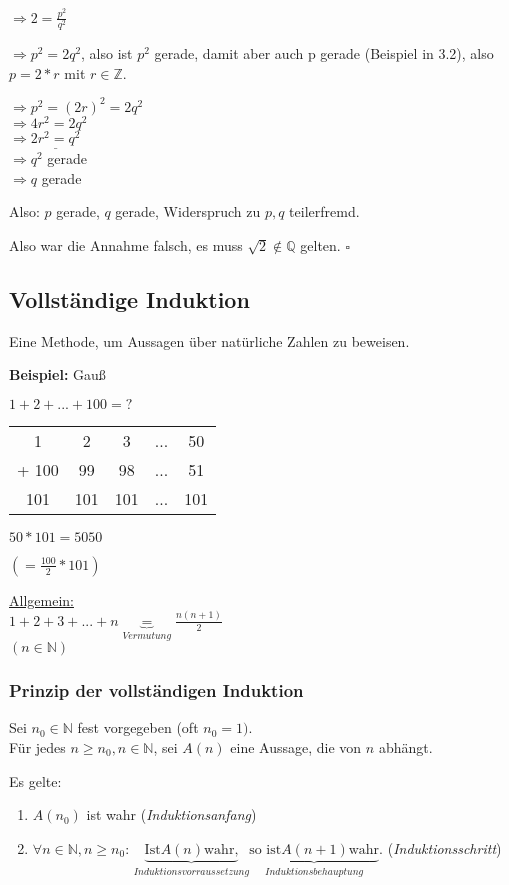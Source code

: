 \documentclass[a4paper, 12pt, twoside] {article}
\begin{document}
$\Rightarrow 2 = \frac{p^2}{q^2}$

$\Rightarrow p^2 = 2q^2$, also ist $p^2$ gerade, damit aber auch p gerade (Beispiel in 3.2), also $p = 2 * r$ mit $r \in \mathbb{Z}$.

$\Rightarrow p^2 = (2r)^2 = 2q^2$ \\
$\Rightarrow 4r^2 = 2q^2$ \\
$\Rightarrow \underline{2r^2 = q^2}$ \\
$\Rightarrow q^2$ gerade \\
$\Rightarrow q$ gerade

Also: $p$ gerade, $q$ gerade, Widerspruch zu $p, q$ teilerfremd.

Also war die Annahme falsch, es muss $\sqrt{2} \notin \mathbb{Q}$ gelten. $\square$

\subsection{Vollständige Induktion}
Eine Methode, um Aussagen über natürliche Zahlen zu beweisen.

\textbf{Beispiel:} Gauß

$ 1 + 2 + ... + 100 = ?$

\begin{tabular}{c c c c c }
1 & 2 & 3 & ... & 50 \\
+ 100 & 99 & 98 & ... & 51 \\
\hline
101 & 101 & 101 & ... & 101 \\
\end{tabular}

$50 * 101 = 5050$

$(= \frac{100}{2} * 101)$

\underline{Allgemein:} \\
$ 1 + 2 + 3 + ... + n \underbrace{=}_{Vermutung} \frac{n (n+1)}{2}$ \\
$(n \in \mathbb{N})$

\subsubsection{Prinzip der vollständigen Induktion}
Sei $n_0 \in \mathbb{N}$ fest vorgegeben (oft $n_0 = 1)$. \\
Für jedes $n \geq n_0, n \in \mathbb{N}$, sei $A(n)$ eine Aussage, die von $n$ abhängt.

Es gelte:
\begin{enumerate}
\item $A(n_0)$ ist wahr (\textit{Induktionsanfang})
\item $\forall n \in \mathbb{N}, n \geq n_0$:
$\underbrace{\text{Ist} A(n) \text{wahr,}}_{Induktionsvorraussetzung} \underbrace{\text{so ist} A(n+1) \text{wahr}}_{Induktionsbehauptung}.$ (\textit{Induktionsschritt})
\end{enumerate}
\end{document}
